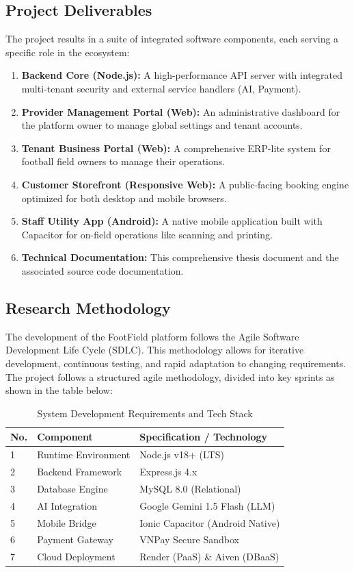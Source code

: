 \subsection{Project Deliverables}
The project results in a suite of integrated software components, each serving a specific role in the ecosystem:
\begin{enumerate}
    \item \textbf{Backend Core (Node.js):} A high-performance API server with integrated multi-tenant security and external service handlers (AI, Payment).
    \item \textbf{Provider Management Portal (Web):} An administrative dashboard for the platform owner to manage global settings and tenant accounts.
    \item \textbf{Tenant Business Portal (Web):} A comprehensive ERP-lite system for football field owners to manage their operations.
    \item \textbf{Customer Storefront (Responsive Web):} A public-facing booking engine optimized for both desktop and mobile browsers.
    \item \textbf{Staff Utility App (Android):} A native mobile application built with Capacitor for on-field operations like scanning and printing.
    \item \textbf{Technical Documentation:} This comprehensive thesis document and the associated source code documentation.
\end{enumerate}

\subsection{Research Methodology}
The development of the FootField platform follows the Agile Software Development Life Cycle (SDLC). This methodology allows for iterative development, continuous testing, and rapid adaptation to changing requirements. 
The project follows a structured agile methodology, divided into key sprints as shown in the table below:

\begin{table}[htbp]
\centering
\begin{tabular}{|l|l|l|}
\hline
\rowcolor{LightCyan}
\textbf{No.} & \textbf{Component} & \textbf{Specification / Technology} \\ \hline
1 & Runtime Environment & Node.js v18+ (LTS) \\ \hline
2 & Backend Framework & Express.js 4.x \\ \hline
3 & Database Engine & MySQL 8.0 (Relational) \\ \hline
4 & AI Integration & Google Gemini 1.5 Flash (LLM) \\ \hline
5 & Mobile Bridge & Ionic Capacitor (Android Native) \\ \hline
6 & Payment Gateway & VNPay Secure Sandbox \\ \hline
7 & Cloud Deployment & Render (PaaS) \& Aiven (DBaaS) \\ \hline
\end{tabular}
\caption{System Development Requirements and Tech Stack}
\label{tab:requirements}
\end{table}

